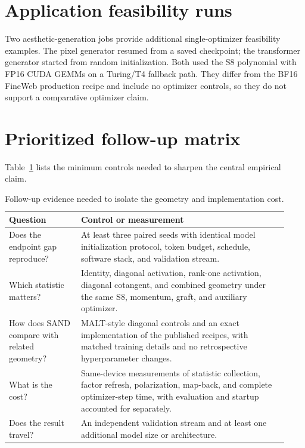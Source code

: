 \documentclass[10pt]{article}
\begin{document}
\section{Application feasibility runs}
Two aesthetic-generation jobs provide additional single-optimizer feasibility examples. The pixel generator resumed from a saved checkpoint; the transformer generator started from random initialization. Both used the S8 polynomial with FP16 CUDA GEMMs on a Turing/T4 fallback path. They differ from the BF16 FineWeb production recipe and include no optimizer controls, so they do not support a comparative optimizer claim.
\begin{table}[h]
\centering
\caption{Single-optimizer application demonstrations. Runs differ in architecture and initialization; these reward values are not an optimizer comparison.}
\label{tab:applications}
\end{table}

\section{Prioritized follow-up matrix}
Table~\ref{tab:next} lists the minimum controls needed to sharpen the central empirical claim.
\begin{table}[h]
\centering
\caption{Follow-up evidence needed to isolate the geometry and implementation cost.}
\label{tab:next}
\begin{tabular}{p{0.24\linewidth}p{0.69\linewidth}}
\toprule
Question & Control or measurement\\
\midrule
Does the endpoint gap reproduce? & At least three paired seeds with identical model initialization protocol, token budget, schedule, software stack, and validation stream.\\
Which statistic matters? & Identity, diagonal activation, rank-one activation, diagonal cotangent, and combined geometry under the same S8, momentum, graft, and auxiliary optimizer.\\
How does SAND compare with related geometry? & MALT-style diagonal controls and an exact implementation of the published recipes, with matched training details and no retrospective hyperparameter changes.\\
What is the cost? & Same-device measurements of statistic collection, factor refresh, polarization, map-back, and complete optimizer-step time, with evaluation and startup accounted for separately.\\
Does the result travel? & An independent validation stream and at least one additional model size or architecture.\\
\bottomrule
\end{tabular}
\end{table}
\end{document}
